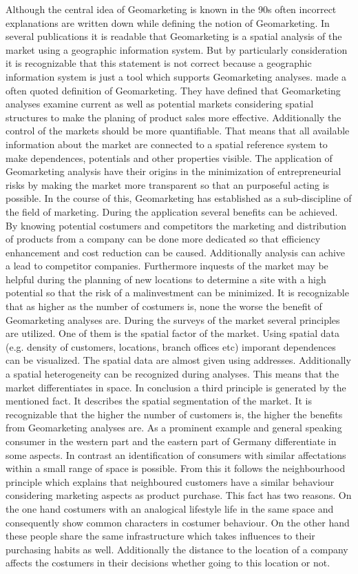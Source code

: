 Although the central idea of Geomarketing is known in the 90s often incorrect explanations are written down while defining the notion of Geomarketing. In several publications it is readable that Geomarketing is a spatial analysis of the market using a geographic information system. But by particularly consideration it is recognizable that this statement is not correct because a geographic information system is just a tool which supports Geomarketing analyses. \citeauthor{herter} \cite{herter} made a often quoted definition of Geomarketing. They have defined that Geomarketing analyses examine current as well as potential markets considering spatial structures to make the planing of product sales more effective. Additionally the control of the markets should be more quantifiable. That means that all available information about the market are connected to a spatial reference system to make dependences, potentials and other properties visible. The application of Geomarketing analysis have their origins in the minimization of entrepreneurial risks by making the market more transparent so that an purposeful acting is possible. In the course of this, Geomarketing has established as a sub-discipline of the field of marketing. During the application several benefits can be achieved. By knowing potential costumers and competitors the marketing and distribution of products from a company can be done more dedicated so that efficiency enhancement and cost reduction can be caused. Additionally analysis can achive a lead to competitor companies. Furthermore inquests of the market may be helpful during the planning of new locations to determine a site with a high potential so that the risk of a malinvestment can be minimized. It is recognizable that as higher as the number of costumers is, none the worse the benefit of Geomarketing analyses are. During the surveys of the market several principles are utilized. One of them is the spatial factor of the market. Using spatial data (e.g. density of customers, locations, branch offices etc) imporant dependences can be visualized. The spatial data are almost given using addresses. Additionally a spatial heterogeneity can be recognized during analyses. This means that the market differentiates in space. In conclusion a third principle is generated by the mentioned fact. It describes the spatial segmentation of the market. It is recognizable that the higher the number of customers is, the higher the benefits from Geomarketing analyses are. As a prominent example and general speaking consumer in the western part and the eastern part of Germany differentiate in some aspects. In contrast an identification of consumers with similar affectations within a small range of space is possible. From this it follows the neighbourhood principle which explains that neighboured customers have a similar behaviour considering marketing aspects as product purchase. This fact has two reasons. On the one hand costumers with an analogical lifestyle life in the same space and consequently show common characters in costumer behaviour. On the other hand these people share the same infrastructure which takes influences to their purchasing habits as well. Additionally the distance to the location of a company affects the costumers in their decisions whether going to this location or not. 
